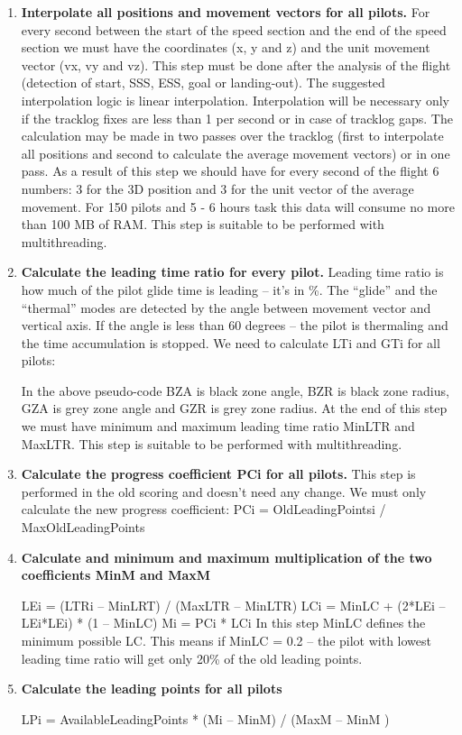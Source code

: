 \documentclass[gap.tex]{subfiles}
\begin{document}
\begin{enumerate}
    \item \textbf{Interpolate all positions and movement vectors for all
        pilots.}  For every second between the start of the speed section and
        the end of the speed section we must have the coordinates (x, y and z)
        and the unit movement vector (vx, vy and vz). This step must be done
        after the analysis of the flight (detection of start, SSS, ESS, goal or
        landing-out). The suggested interpolation logic is linear
        interpolation. Interpolation will be necessary only if the tracklog
        fixes are less than 1 per second or in case of tracklog gaps. The
        calculation may be made in two passes over the tracklog (first to
        interpolate all positions and second to calculate the average movement
        vectors) or in one pass. As a result of this step we should have for
        every second of the flight 6 numbers: 3 for the 3D position and 3 for
        the unit vector of the average movement. For 150 pilots and 5 - 6 hours
        task this data will consume no more than 100 MB of RAM. This step is
        suitable to be performed with multithreading.

    \item \textbf{Calculate the leading time ratio for every pilot.} Leading
        time ratio is how much of the pilot glide time is leading – it’s in \%.
        The “glide” and the “thermal” modes are detected by the angle between
        movement vector and vertical axis. If the angle is less than 60 degrees
        – the pilot is thermaling and the time accumulation is stopped. We need
        to calculate LTi and GTi for all pilots:

        In the above pseudo-code BZA is black zone angle, BZR is black zone
        radius, GZA is grey zone angle and GZR is grey zone radius. At the end
        of this step we must have minimum and maximum leading time ratio MinLTR
        and MaxLTR. This step is suitable to be performed with multithreading.

    \item \textbf{Calculate the progress coefficient PCi for all pilots.} This
        step is performed in the old scoring and doesn’t need any change. We
        must only calculate the new progress coefficient: PCi
        = OldLeadingPointsi / MaxOldLeadingPoints

    \item \textbf{Calculate and minimum and maximum multiplication of the two
        coefficients MinM and MaxM}
        
        LEi = (LTRi – MinLRT) / (MaxLTR – MinLTR) LCi = MinLC + (2*LEi
        – LEi*LEi) * (1 – MinLC) Mi = PCi * LCi In this step MinLC defines the
        minimum possible LC. This means if MinLC = 0.2 – the pilot with lowest
        leading time ratio will get only 20\% of the old leading points.

    \item \textbf{Calculate the leading points for all pilots}
        
        LPi = AvailableLeadingPoints * (Mi – MinM) / (MaxM – MinM ) \end{enumerate}
\end{document}
